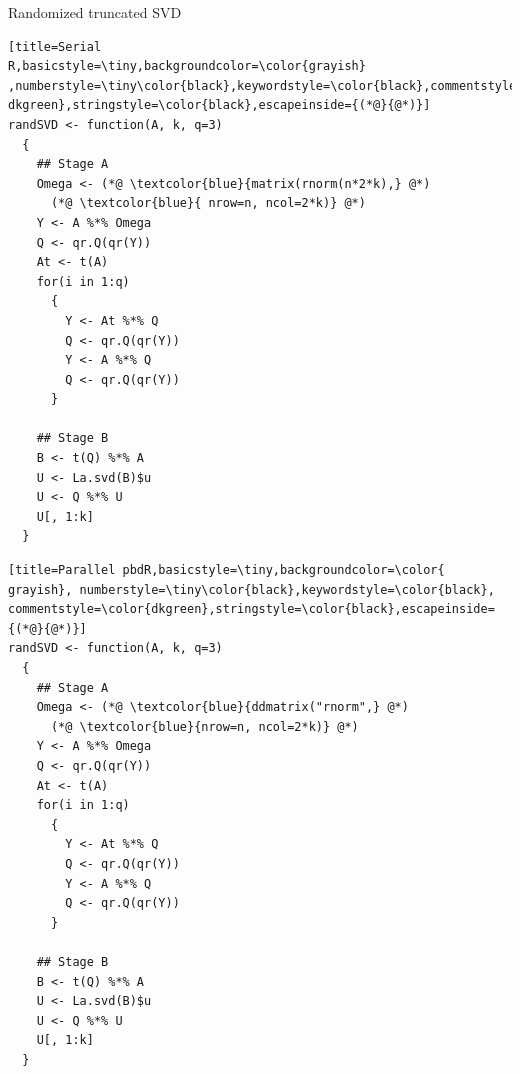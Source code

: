 \begin{frame}[fragile]
 \fontsize{8pt}{10}\selectfont
\begin{block}{Randomized truncated SVD}
  \hfill
  \begin{minipage}{0.430\textwidth}
\begin{lstlisting}[title=Serial
R,basicstyle=\tiny,backgroundcolor=\color{grayish}
,numberstyle=\tiny\color{black},keywordstyle=\color{black},commentstyle=\color{
dkgreen},stringstyle=\color{black},escapeinside={(*@}{@*)}]
randSVD <- function(A, k, q=3)
  {
    ## Stage A
    Omega <- (*@ \textcolor{blue}{matrix(rnorm(n*2*k),} @*)
      (*@ \textcolor{blue}{ nrow=n, ncol=2*k)} @*)
    Y <- A %*% Omega
    Q <- qr.Q(qr(Y))
    At <- t(A)
    for(i in 1:q)
      {
        Y <- At %*% Q
        Q <- qr.Q(qr(Y))
        Y <- A %*% Q
        Q <- qr.Q(qr(Y))
      }

    ## Stage B
    B <- t(Q) %*% A
    U <- La.svd(B)$u
    U <- Q %*% U
    U[, 1:k]
  }
\end{lstlisting} %
  \end{minipage}
  \hfill
  \begin{minipage}{0.430\textwidth}
\begin{lstlisting}[title=Parallel pbdR,basicstyle=\tiny,backgroundcolor=\color{
grayish}, numberstyle=\tiny\color{black},keywordstyle=\color{black},
commentstyle=\color{dkgreen},stringstyle=\color{black},escapeinside={(*@}{@*)}]
randSVD <- function(A, k, q=3)
  {
    ## Stage A
    Omega <- (*@ \textcolor{blue}{ddmatrix("rnorm",} @*)
      (*@ \textcolor{blue}{nrow=n, ncol=2*k)} @*)
    Y <- A %*% Omega
    Q <- qr.Q(qr(Y))
    At <- t(A)
    for(i in 1:q)
      {
        Y <- At %*% Q
        Q <- qr.Q(qr(Y))
        Y <- A %*% Q
        Q <- qr.Q(qr(Y))
      }

    ## Stage B
    B <- t(Q) %*% A
    U <- La.svd(B)$u
    U <- Q %*% U
    U[, 1:k]
  }
\end{lstlisting}  %
  \end{minipage}
\hfill
\end{block}
\end{frame}


